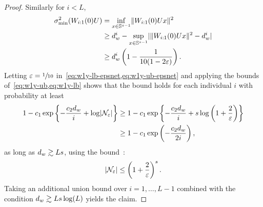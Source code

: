 \begin{proof}
	Similarly for $i<L$,
	\begin{align}
		\sigma_{\min}^2(W_{i:1}(0) U) & = \inf_{x \in \mathbb{S}^{s-1}}
		\lVert W_{i:1}(0) U x\rVert^2 \notag                                                                                       \\
		                               & \geq d_w^i - \sup_{x \in \mathbb{S}^{s-1}} \lvert\lVert W_{i:1}(0) U x\rVert^2 - d_w^i\rvert \notag   \\
		                               & \geq d_w^i \left(1 - \frac{1}{10(1 - 2 \varepsilon)}\right).
                                       \label{eq:w1y-lb-epsnet}
	\end{align}
	Letting $\varepsilon = \sfrac{1}{10}$ in~\cref{eq:w1y-lb-epsnet,eq:w1y-ub-epsnet} and applying the bounds of~\cref{eq:w1y-ub,eq:w1y-lb} shows that the bound holds for each individual $i$ with probability at least
	\begin{align*}
		1 - c_1 \exp\left\{-\frac{c_2 d_{w}}{i} + \log \lvert\mathcal{N}_{\varepsilon}\rvert\right\} & \geq
		1 - c_1 \exp\left\{-\frac{c_2 d_{w}}{i} + s \log \left(1 + \frac{2}{\varepsilon}\right)\right\} \\
		                                                                         & \geq
		1 - c_1 \exp\left(-\frac{c_2 d_{w}}{2i}\right),
	\end{align*}
	as long as $d_{w} \gtrsim L s$, using the bound~\citep[Corollary 4.2.13]{Ver18}:
	\[
		\lvert\mathcal{N}_{\varepsilon}\rvert \leq \left(1 + \frac{2}{\varepsilon}\right)^{s}.
	\]
	Taking an additional union bound over $i = 1, \dots, L-1$ combined with the condition
    $d_{w} \gtrsim L s \log(L)$ yields the claim.
\end{proof}

